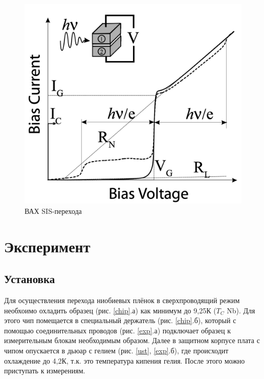\documentclass[12pt,a4paper]{article}
\begin{document}
\begin{figure}[H]
    \centering
    \includegraphics[scale = 0.4]{i-v-curve.png}
    \caption{ВАХ SIS-перехода}
    \label{sis-iv}
\end{figure}


\newpage

\section{Эксперимент}

\subsection{Установка}

Для осуществления перехода ниобиевых плёнок в сверхпроводящий режим необхоимо охладить образец (рис. \ref{chip}.а) как минимум до 9,25К ({$T_C$} Nb). Для этого чип помещается в специальный держатель (рис. \ref{chip}.б), который с помощью соединительных проводов (рис. \ref{exp}.а) подключает образец к измерительным блокам необходимым образом. Далее в защитном корпусе плата с чипом опускается в дьюар с гелием (рис. \ref{ust}, \ref{exp}.б), где происходит охлаждение до 4,2К, т.к. это температура кипения гелия. После этого можно приступать к измерениям.
\end{document}
